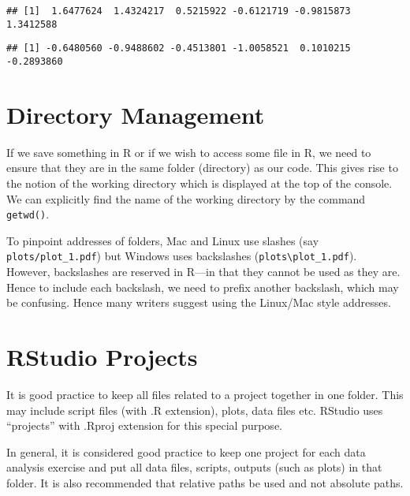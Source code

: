 \documentclass[]{article}
\newenvironment{Shaded}{\begin{snugshade}}{\end{snugshade}}
\newcommand{\KeywordTok}[1]{\textcolor[rgb]{0.13,0.29,0.53}{\textbf{#1}}}
\newcommand{\DecValTok}[1]{\textcolor[rgb]{0.00,0.00,0.81}{#1}}
\newcommand{\StringTok}[1]{\textcolor[rgb]{0.31,0.60,0.02}{#1}}
\newcommand{\OperatorTok}[1]{\textcolor[rgb]{0.81,0.36,0.00}{\textbf{#1}}}
\newcommand{\NormalTok}[1]{#1}
\begin{document}
\begin{verbatim}
## [1]  1.6477624  1.4324217  0.5215922 -0.6121719 -0.9815873  1.3412588
\end{verbatim}

\begin{Shaded}
\end{Shaded}

\begin{verbatim}
## [1] -0.6480560 -0.9488602 -0.4513801 -1.0058521  0.1010215 -0.2893860
\end{verbatim}

\section{Directory Management}\label{directory-management}

If we save something in R or if we wish to access some file in R, we
need to ensure that they are in the same folder (directory) as our code.
This gives rise to the notion of the working directory which is
displayed at the top of the console. We can explicitly find the name of
the working directory by the command \texttt{getwd()}.

To pinpoint addresses of folders, Mac and Linux use slashes (say
\texttt{plots/plot\_1.pdf}) but Windows uses backslashes
(\texttt{plots\textbackslash{}plot\_1.pdf}). However, backslashes are
reserved in R---in that they cannot be used as they are. Hence to
include each backslash, we need to prefix another backslash, which may
be confusing. Hence many writers suggest using the Linux/Mac style
addresses.

\section{RStudio Projects}\label{rstudio-projects}

It is good practice to keep all files related to a project together in
one folder. This may include script files (with .R extension), plots,
data files etc. RStudio uses ``projects'' with .Rproj extension for this
special purpose.

In general, it is considered good practice to keep one project for each
data analysis exercise and put all data files, scripts, outputs (such as
plots) in that folder. It is also recommended that relative paths be
used and not absolute paths.
\end{document}
